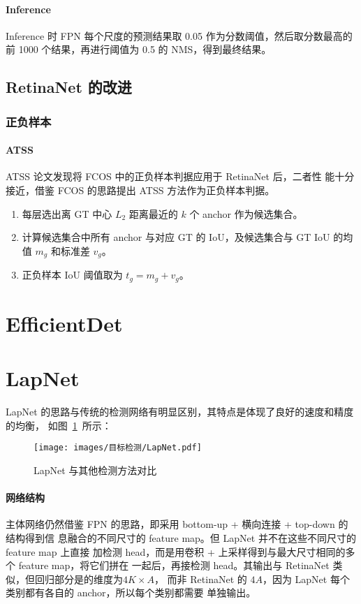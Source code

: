\paragraph{Inference}
Inference 时 FPN 每个尺度的预测结果取 0.05 作为分数阈值，然后取分数最高的前 1000
个结果，再进行阈值为 0.5 的 NMS，得到最终结果。

\subsection{RetinaNet 的改进}

\subsubsection{正负样本}
\paragraph{ATSS}
ATSS 论文发现将 FCOS\cite{2019-FCOS} 中的正负样本判据应用于 RetinaNet 后，二者性
能十分接近，借鉴 FCOS 的思路提出 ATSS 方法作为正负样本判据。

\begin{enumerate}
  \item 每层选出离 GT 中心 $L_2$ 距离最近的 $k$ 个 anchor 作为候选集合。
  \item 计算候选集合中所有 anchor 与对应 GT 的 IoU，及候选集合与 GT IoU 的均值 $m_g$ 和标准差 $v_g$。
  \item 正负样本 IoU 阈值取为 $t_g = m_g + v_g$。
\end{enumerate}

\section{EfficientDet}

\section{LapNet}
LapNet 的思路与传统的检测网络有明显区别，其特点是体现了良好的速度和精度的均衡，
如图~\ref{fig:LapNet}~所示：

\begin{figure}[ht]
  \centering
  \texttt{[image: images/目标检测/LapNet.pdf]}
  \caption{LapNet 与其他检测方法对比}
  \label{fig:LapNet}
\end{figure}

\paragraph{网络结构}
主体网络仍然借鉴 FPN 的思路，即采用 bottom-up + 横向连接 + top-down 的结构得到信
息融合的不同尺寸的 feature map。但 LapNet 并不在这些不同尺寸的feature map 上直接
加检测 head，而是用卷积 + 上采样得到与最大尺寸相同的多个 feature map，将它们拼在
一起后，再接检测 head。其输出与 RetinaNet 类似，但回归部分是的维度为$4 K \times A$，
而非 RetinaNet 的 $4A$，因为 LapNet 每个类别都有各自的 anchor，所以每个类别都需要
单独输出。

